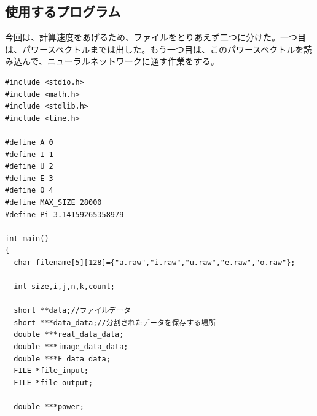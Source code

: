 \documentclass[a4j,12]{jarticle}
\begin{document}
\subsection{使用するプログラム}
今回は、計算速度をあげるため、ファイルをとりあえず二つに分けた。一つ目は、パワースペクトルまでは出した。もう一つ目は、このパワースペクトルを読み込んで、ニューラルネットワークに通す作業をする。
\begin{lstlisting}[caption=パワースペクトル計算するプログラム,label=ラベル]
#include <stdio.h>
#include <math.h>
#include <stdlib.h>
#include <time.h>

#define A 0
#define I 1
#define U 2
#define E 3
#define O 4
#define MAX_SIZE 28000
#define Pi 3.14159265358979

int main()
{
  char filename[5][128]={"a.raw","i.raw","u.raw","e.raw","o.raw"};

  int size,i,j,n,k,count;

  short **data;//ファイルデータ
  short ***data_data;//分割されたデータを保存する場所
  double ***real_data_data;
  double ***image_data_data;
  double ***F_data_data;
  FILE *file_input;
  FILE *file_output;
  
  double ***power;
  

\end{lstlisting}
\end{document}
